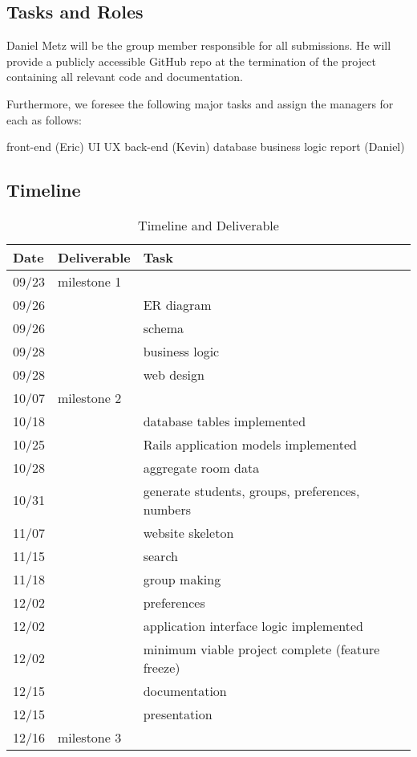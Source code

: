 \subsection{Tasks and Roles}
Daniel Metz will be the group member responsible for all submissions. He will
provide a publicly accessible GitHub repo at the termination of the project
containing all relevant code and documentation.

Furthermore, we foresee the following major tasks and assign the
managers for each as follows:

\begin{outline}
\1 front-end (Eric)
    \2 UI
    \2 UX
\1 back-end (Kevin)
    \2 database
    \2 business logic
\1 report (Daniel)
\end{outline}

\subsection{Timeline}

\begin{table}[h] \centering
\begin{tabular}{lll} \toprule
Date & Deliverable & Task \\ \midrule
09/23 & milestone 1  \\ \midrule
09/26 & ~ & ER diagram \\
09/26 & ~ & schema \\
09/28 & ~ & business logic \\
09/28 & ~ & web design \\ \midrule
10/07 & milestone 2  \\ \midrule
10/18 & ~ & database tables implemented \\
10/25 & ~ & Rails application models implemented \\
10/28 & ~ & aggregate room data \\
10/31 & ~ & generate students, groups, preferences, numbers \\
11/07 & ~ & website skeleton \\
11/15 & ~ & search \\
11/18 & ~ & group making \\
12/02 & ~ & preferences \\
12/02 & ~ & application interface logic implemented \\
12/02 & ~ & minimum viable project complete (feature freeze) \\
12/15 & ~ & documentation \\
12/15 & ~ & presentation \\ \midrule
12/16 & milestone 3 \\
\bottomrule
\end{tabular}
\caption{Timeline and Deliverable}
\end{table}